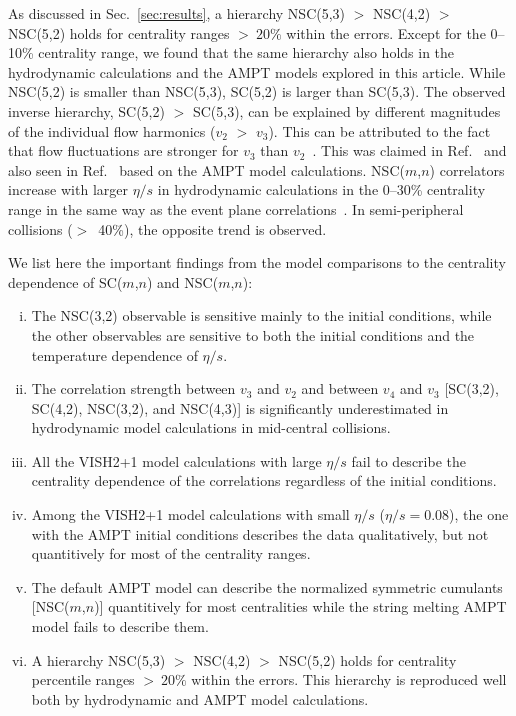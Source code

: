 As discussed in Sec.~\ref{sec:results}, a hierarchy NSC(5,3) $>$ NSC(4,2) $>$ NSC(5,2) holds for centrality ranges $>~20\%$ within the errors.
Except for the 0--10\% centrality range, we found that the same hierarchy also holds in the hydrodynamic calculations and the AMPT models explored in this article.
While NSC(5,2) is smaller than NSC(5,3), SC(5,2) is larger than SC(5,3).
The observed inverse hierarchy, SC(5,2) $>$ SC(5,3), can be explained by different magnitudes of the individual flow harmonics ($v_2$ $>$ $v_3$). 
This can be attributed to the fact that flow fluctuations are stronger for $v_3$ than $v_2$~\cite{Aad:2013xma}. This was claimed in Ref.~\cite{Zhu:2016puf} and also seen in Ref.~\cite{Bhalerao:2014xra} based on the AMPT model calculations. 
NSC($m$,$n$) correlators increase with larger $\eta/s$ in hydrodynamic calculations in the 0--30\% centrality range in the same way as the event plane correlations~\cite{Bhalerao:2013ina,Teaney:2013dta}. In semi-peripheral collisions ($>$~40\%), the opposite trend is observed.

We list here the important findings from the model comparisons to the centrality dependence of SC($m$,$n$) and NSC($m$,$n$):
\begin{enumerate}[(i)]
	\item The NSC(3,2) observable is sensitive mainly to the initial conditions, while the other observables are sensitive to both the initial conditions and the temperature dependence of $\eta/s$.
	\item The correlation strength between $v_3$ and $v_2$ and between $v_4$ and $v_3$ [SC(3,2), SC(4,2), NSC(3,2), and NSC(4,3)] is significantly underestimated in hydrodynamic model calculations in mid-central collisions.
	\item All the VISH2+1 model calculations with large $\eta/s$ fail to describe the centrality dependence of the correlations regardless of the initial conditions.
	\item Among the VISH2+1 model calculations with small $\eta/s$ ($\eta/s=0.08$), the one with the AMPT initial conditions describes the data qualitatively, but not quantitively for most of the centrality ranges.
	\item The default AMPT model can describe the normalized symmetric cumulants [NSC($m$,$n$)] quantitively for most centralities while the string melting AMPT model fails to describe them.
	\item A hierarchy NSC(5,3) $>$ NSC(4,2) $>$ NSC(5,2) holds for centrality percentile ranges $>~20\%$ within the errors. This hierarchy is reproduced well both by hydrodynamic and AMPT model calculations.
\end{enumerate}

